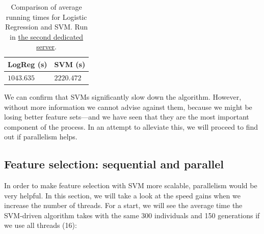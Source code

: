 		\vspace{0.3cm}

		\begin{table}[h]

	        \centering
	        \setlength\arrayrulewidth{0.8pt}

	        \begin{tabular}{| >{\centering\arraybackslash}m{0.9in} | >{\centering\arraybackslash}m{0.9in} |}

	            \hline
	            \rowcolor{RoyalBlue}
	            \textbf{LogReg (s)} & \textbf{SVM (s)} \\
	            \hline
	            $1043.635$ & $2220.472$ \\
	            \hline

	        \end{tabular}

	        \caption[Average running times: Logistic Regression versus SVM]{Comparison of average running times for Logistic Regression and \acs{SVM}. Run in \hyperlink{server:secondserver}{the second dedicated server}.}\label{table:logreg_svm_speed}

	    \end{table}

	    We can confirm that \acs{SVM}s significantly slow down the algorithm. However, without more information we cannot advise against them, because we might be losing better feature sets---and we have seen that they are the most important component of the process. In an attempt to alleviate this, we will proceed to find out if parallelism helps.

	\subsection{Feature selection: sequential and parallel}

		In order to make feature selection with \acs{SVM} more scalable, parallelism would be very helpful. In this section, we will take a look at the speed gains when we increase the number of threads. For a start, we will see the average time the \acs{SVM}-driven algorithm takes with the same 300 individuals and 150 generations if we use all threads (16):

		\vspace{0.1cm}

